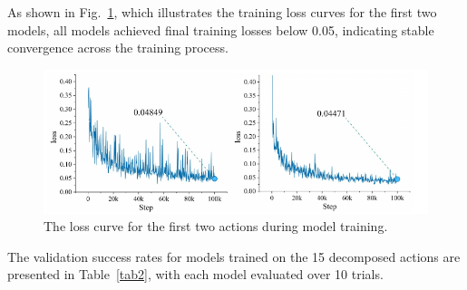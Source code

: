 \documentclass[runningheads]{llncs}
\begin{document}
As shown in Fig.~\ref{fig14}, which illustrates the training loss curves for the first two models, all models achieved final training losses below 0.05, indicating stable convergence across the training process.


\begin{figure}
\centering
\includegraphics[width=323pt]{fig15.pdf}
\caption{The loss curve for the first two actions during model training.} \label{fig14}
\end{figure}


\noindent The validation success rates for models trained on the 15 decomposed actions are presented in Table~\ref{tab2}, with each model evaluated over 10 trials. 
\end{document}
